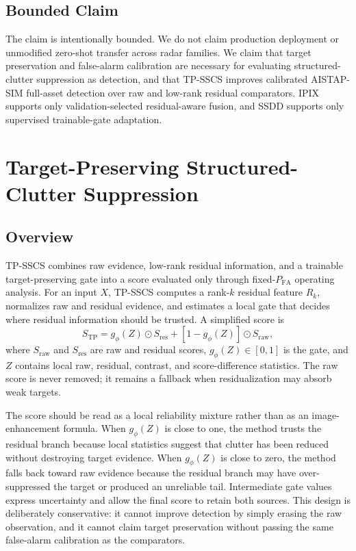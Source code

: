\documentclass[journal]{IEEEtran}
\begin{document}
\subsection{Bounded Claim}

The claim is intentionally bounded. We do not claim production deployment or unmodified zero-shot transfer across radar families. We claim that target preservation and false-alarm calibration are necessary for evaluating structured-clutter suppression as detection, and that TP-SSCS improves calibrated AISTAP-SIM full-asset detection over raw and low-rank residual comparators. IPIX supports only validation-selected residual-aware fusion, and SSDD supports only supervised trainable-gate adaptation.

\section{Target-Preserving Structured-Clutter Suppression}

\subsection{Overview}

TP-SSCS combines raw evidence, low-rank residual information, and a trainable target-preserving gate into a score evaluated only through fixed-$P_{\mathrm{FA}}$ operating analysis. For an input $X$, TP-SSCS computes a rank-$k$ residual feature $R_k$, normalizes raw and residual evidence, and estimates a local gate that decides where residual information should be trusted. A simplified score is
\begin{equation}
    S_{\mathrm{TP}} = g_\phi(Z) \odot S_{\mathrm{res}} +
    [1 - g_\phi(Z)] \odot S_{\mathrm{raw}},
\end{equation}
where $S_{\mathrm{raw}}$ and $S_{\mathrm{res}}$ are raw and residual scores, $g_\phi(Z)\in[0,1]$ is the gate, and $Z$ contains local raw, residual, contrast, and score-difference statistics. The raw score is never removed; it remains a fallback when residualization may absorb weak targets.

The score should be read as a local reliability mixture rather than as an image-enhancement formula. When $g_\phi(Z)$ is close to one, the method trusts the residual branch because local statistics suggest that clutter has been reduced without destroying target evidence. When $g_\phi(Z)$ is close to zero, the method falls back toward raw evidence because the residual branch may have over-suppressed the target or produced an unreliable tail. Intermediate gate values express uncertainty and allow the final score to retain both sources. This design is deliberately conservative: it cannot improve detection by simply erasing the raw observation, and it cannot claim target preservation without passing the same false-alarm calibration as the comparators.
\end{document}
